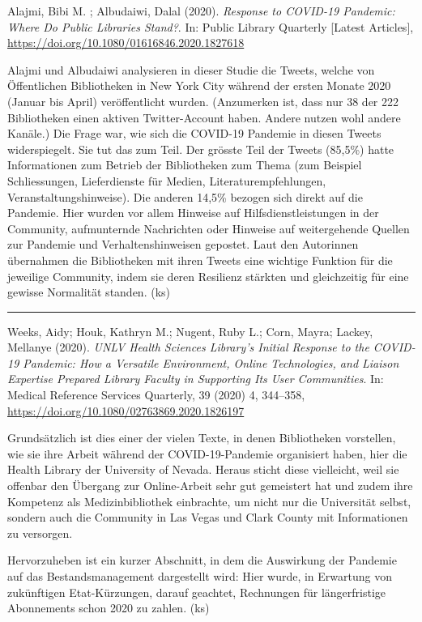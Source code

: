 \documentclass[a4paper,
fontsize=11pt,
oneside,
numbers=noperiodatend,
parskip=half-,
bibliography=totoc,
final
]{scrartcl}
\begin{document}
Alajmi, Bibi M. ; Albudaiwi, Dalal (2020). \emph{Response to COVID-19
Pandemic: Where Do Public Libraries Stand?}. In: Public Library
Quarterly {[}Latest Articles{]},
\url{https://doi.org/10.1080/01616846.2020.1827618}

Alajmi und Albudaiwi analysieren in dieser Studie die Tweets, welche von
Öffentlichen Bibliotheken in New York City während der ersten Monate
2020 (Januar bis April) veröffentlicht wurden. (Anzumerken ist, dass nur
38 der 222 Bibliotheken einen aktiven Twitter-Account haben. Andere
nutzen wohl andere Kanäle.) Die Frage war, wie sich die COVID-19
Pandemie in diesen Tweets widerspiegelt. Sie tut das zum Teil. Der
grösste Teil der Tweets (85,5\%) hatte Informationen zum Betrieb der
Bibliotheken zum Thema (zum Beispiel Schliessungen, Lieferdienste für
Medien, Literaturempfehlungen, Veranstaltungshinweise). Die anderen
14,5\% bezogen sich direkt auf die Pandemie. Hier wurden vor allem
Hinweise auf Hilfsdienstleistungen in der Community, aufmunternde
Nachrichten oder Hinweise auf weitergehende Quellen zur Pandemie und
Verhaltenshinweisen gepostet. Laut den Autorinnen übernahmen die
Bibliotheken mit ihren Tweets eine wichtige Funktion für die jeweilige
Community, indem sie deren Resilienz stärkten und gleichzeitig für eine
gewisse Normalität standen. (ks)

\begin{center}\rule{0.5\linewidth}{0.5pt}\end{center}

Weeks, Aidy; Houk, Kathryn M.; Nugent, Ruby L.; Corn, Mayra; Lackey,
Mellanye (2020). \emph{UNLV Health Sciences Library's Initial Response
to the COVID-19 Pandemic: How a Versatile Environment, Online
Technologies, and Liaison Expertise Prepared Library Faculty in
Supporting Its User Communities}. In: Medical Reference Services
Quarterly, 39 (2020) 4, 344--358,
\url{https://doi.org/10.1080/02763869.2020.1826197}

Grundsätzlich ist dies einer der vielen Texte, in denen Bibliotheken
vorstellen, wie sie ihre Arbeit während der COVID-19-Pandemie
organisiert haben, hier die Health Library der University of Nevada.
Heraus sticht diese vielleicht, weil sie offenbar den Übergang zur
Online-Arbeit sehr gut gemeistert hat und zudem ihre Kompetenz als
Medizinbibliothek einbrachte, um nicht nur die Universität selbst,
sondern auch die Community in Las Vegas und Clark County mit
Informationen zu versorgen.

Hervorzuheben ist ein kurzer Abschnitt, in dem die Auswirkung der
Pandemie auf das Bestandsmanagement dargestellt wird: Hier wurde, in
Erwartung von zukünftigen Etat-Kürzungen, darauf geachtet, Rechnungen
für längerfristige Abonnements schon 2020 zu zahlen. (ks)
\end{document}
